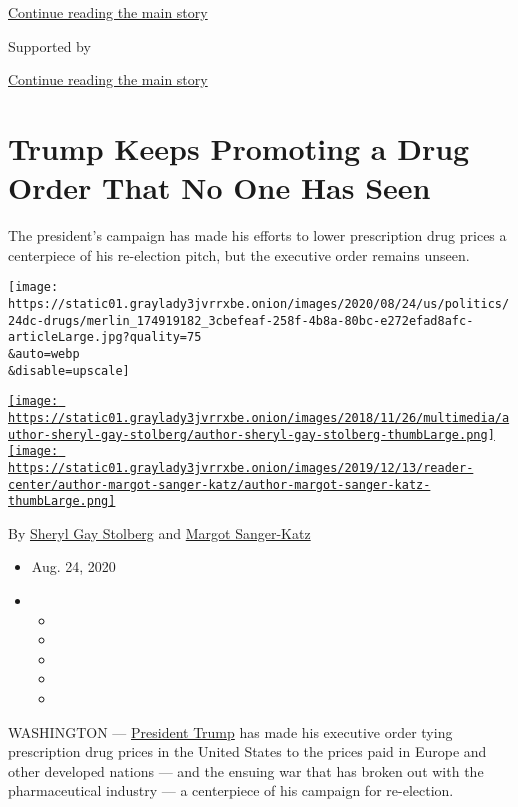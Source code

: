 \protect\hyperlink{after-top}{Continue reading the main story}

Supported by

\protect\hyperlink{after-sponsor}{Continue reading the main story}

\hypertarget{trump-keeps-promoting-a-drug-order-that-no-one-has-seen}{%
\section{Trump Keeps Promoting a Drug Order That No One Has
Seen}\label{trump-keeps-promoting-a-drug-order-that-no-one-has-seen}}

The president's campaign has made his efforts to lower prescription drug
prices a centerpiece of his re-election pitch, but the executive order
remains unseen.

\texttt{[image: https://static01.graylady3jvrrxbe.onion/images/2020/08/24/us/politics/24dc-drugs/merlin\_174919182\_3cbefeaf-258f-4b8a-80bc-e272efad8afc-articleLarge.jpg?quality=75\\\&auto=webp\\\&disable=upscale]}

\href{https://www.nytimes3xbfgragh.onion/by/sheryl-gay-stolberg}{\texttt{[image: https://static01.graylady3jvrrxbe.onion/images/2018/11/26/multimedia/author-sheryl-gay-stolberg/author-sheryl-gay-stolberg-thumbLarge.png]}}\href{https://www.nytimes3xbfgragh.onion/by/margot-sanger-katz}{\texttt{[image: https://static01.graylady3jvrrxbe.onion/images/2019/12/13/reader-center/author-margot-sanger-katz/author-margot-sanger-katz-thumbLarge.png]}}

By
\href{https://www.nytimes3xbfgragh.onion/by/sheryl-gay-stolberg}{Sheryl
Gay Stolberg} and
\href{https://www.nytimes3xbfgragh.onion/by/margot-sanger-katz}{Margot
Sanger-Katz}

\begin{itemize}
\item
  Aug. 24, 2020
\item
  \begin{itemize}
  \item
  \item
  \item
  \item
  \item
  \end{itemize}
\end{itemize}

WASHINGTON ---
\href{https://www.nytimes3xbfgragh.onion/2020/08/26/us/politics/trump-convention-night-2.html}{President
Trump} has made his executive order tying prescription drug prices in
the United States to the prices paid in Europe and other developed
nations --- and the ensuing war that has broken out with the
pharmaceutical industry --- a centerpiece of his campaign for
re-election.

